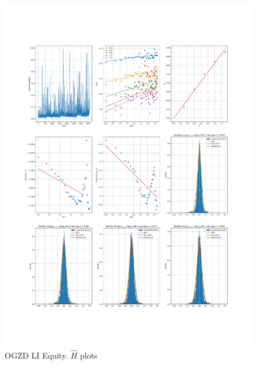     \begin{figure}[h]
        \centering
        \includegraphics[width=\textwidth]{fig/OGZD LI Equity.pdf}
        \caption{OGZD LI Equity. $\hat{H}$ plots}
    \end{figure} 
        
